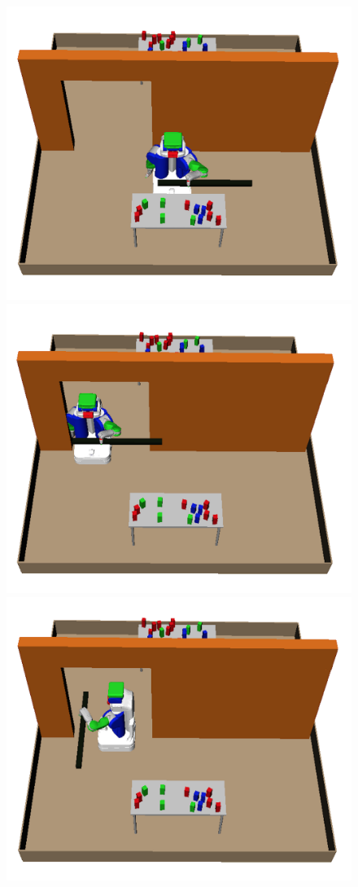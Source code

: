 \begin{figure}[htb]
\centering
\includegraphics[scale=0.21]{./figures/motivation/1.png}
\includegraphics[scale=0.2]{./figures/motivation/3.png}\\
\includegraphics[scale=0.21]{./figures/motivation/4.png}

\end{figure}
